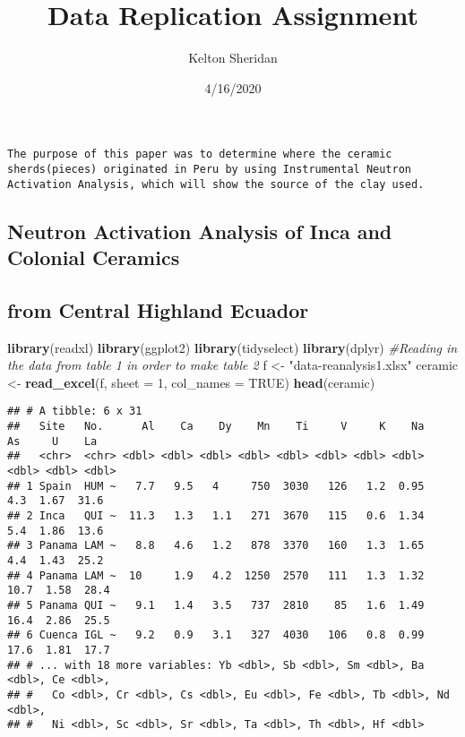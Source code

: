 \documentclass[]{article}
\title{Data Replication Assignment}
\author{Kelton Sheridan}
\date{4/16/2020}
\newenvironment{Shaded}{\begin{snugshade}}{\end{snugshade}}
\newcommand{\CommentTok}[1]{\textcolor[rgb]{0.56,0.35,0.01}{\textit{#1}}}
\newcommand{\DataTypeTok}[1]{\textcolor[rgb]{0.13,0.29,0.53}{#1}}
\newcommand{\DecValTok}[1]{\textcolor[rgb]{0.00,0.00,0.81}{#1}}
\newcommand{\KeywordTok}[1]{\textcolor[rgb]{0.13,0.29,0.53}{\textbf{#1}}}
\newcommand{\NormalTok}[1]{#1}
\newcommand{\OtherTok}[1]{\textcolor[rgb]{0.56,0.35,0.01}{#1}}
\newcommand{\StringTok}[1]{\textcolor[rgb]{0.31,0.60,0.02}{#1}}
\begin{document}
\maketitle

\begin{verbatim}
The purpose of this paper was to determine where the ceramic sherds(pieces) originated in Peru by using Instrumental Neutron Activation Analysis, which will show the source of the clay used. 
\end{verbatim}

\hypertarget{neutron-activation-analysis-of-inca-and-colonial-ceramics}{%
\subsection{Neutron Activation Analysis of Inca and Colonial
Ceramics}\label{neutron-activation-analysis-of-inca-and-colonial-ceramics}}

\hypertarget{from-central-highland-ecuador}{%
\subsection{from Central Highland
Ecuador}\label{from-central-highland-ecuador}}

\begin{Shaded}
\begin{Highlighting}[]
\KeywordTok{library}\NormalTok{(readxl)}
\KeywordTok{library}\NormalTok{(ggplot2)}
\KeywordTok{library}\NormalTok{(tidyselect)}
\KeywordTok{library}\NormalTok{(dplyr)}
\CommentTok{#Reading in the data from table 1 in order to make table 2}
\NormalTok{f <-}\StringTok{ "data-reanalysis1.xlsx"}
\NormalTok{ceramic <-}\StringTok{ }\KeywordTok{read_excel}\NormalTok{(f, }\DataTypeTok{sheet =} \DecValTok{1}\NormalTok{, }\DataTypeTok{col_names =} \OtherTok{TRUE}\NormalTok{)}
\KeywordTok{head}\NormalTok{(ceramic)}
\end{Highlighting}
\end{Shaded}

\begin{verbatim}
## # A tibble: 6 x 31
##   Site   No.      Al    Ca    Dy    Mn    Ti     V     K    Na    As     U    La
##   <chr>  <chr> <dbl> <dbl> <dbl> <dbl> <dbl> <dbl> <dbl> <dbl> <dbl> <dbl> <dbl>
## 1 Spain  HUM ~   7.7   9.5   4     750  3030   126   1.2  0.95   4.3  1.67  31.6
## 2 Inca   QUI ~  11.3   1.3   1.1   271  3670   115   0.6  1.34   5.4  1.86  13.6
## 3 Panama LAM ~   8.8   4.6   1.2   878  3370   160   1.3  1.65   4.4  1.43  25.2
## 4 Panama LAM ~  10     1.9   4.2  1250  2570   111   1.3  1.32  10.7  1.58  28.4
## 5 Panama QUI ~   9.1   1.4   3.5   737  2810    85   1.6  1.49  16.4  2.86  25.5
## 6 Cuenca IGL ~   9.2   0.9   3.1   327  4030   106   0.8  0.99  17.6  1.81  17.7
## # ... with 18 more variables: Yb <dbl>, Sb <dbl>, Sm <dbl>, Ba <dbl>, Ce <dbl>,
## #   Co <dbl>, Cr <dbl>, Cs <dbl>, Eu <dbl>, Fe <dbl>, Tb <dbl>, Nd <dbl>,
## #   Ni <dbl>, Sc <dbl>, Sr <dbl>, Ta <dbl>, Th <dbl>, Hf <dbl>
\end{verbatim}
\end{document}
